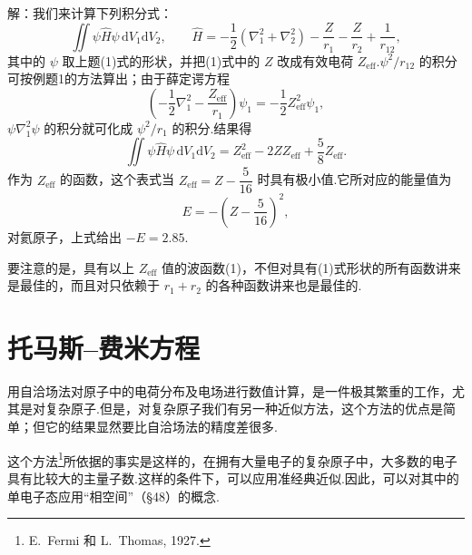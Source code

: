 \begin{xiti}
解：我们来计算下列积分式：
\begin{equation*}
  \iint\psi\hat{H}\psi\,\mathrm{d}V_1\mathrm{d}V_2,
  \qquad
  \hat{H}=-\frac{1}{2}\left(\nabla_1^{2}+\nabla_2^{2}\right)-\frac{Z}{r_1}-\frac{Z}{r_2}+\frac{1}{r_{12}},
\end{equation*}
其中的 $\psi$ 取上题(1)式的形状，并把(1)式中的 $Z$ 改成有效电荷 $Z_{\mathrm{eff}}$.$\psi^{2}/r_{12}$ 的积分可按例题1的方法算出；由于薛定谔方程
\begin{equation*}
  \left(-\frac{1}{2}\nabla_1^{2}-\frac{Z_{\mathrm{eff}}}{r_1}\right)\psi_1=-\frac{1}{2}Z_{\mathrm{eff}}^{2}\psi_1,
\end{equation*}
$\psi\nabla_1^{2}\psi$ 的积分就可化成 $\psi^{2}/r_1$ 的积分.结果得
\begin{equation*}
  \iint\psi\hat{H}\psi\,\mathrm{d}V_1\mathrm{d}V_2
  =Z_{\mathrm{eff}}^{2}-2ZZ_{\mathrm{eff}}+\frac{5}{8}Z_{\mathrm{eff}}.
\end{equation*}
作为 $Z_{\mathrm{eff}}$ 的函数，这个表式当 $Z_{\mathrm{eff}}=Z-\dfrac{5}{16}$ 时具有极小值.它所对应的能量值为
\begin{equation*}
  E=-\left(Z-\frac{5}{16}\right)^{2},
\end{equation*}
对氦原子，上式给出 $-E=2.85$.

要注意的是，具有以上 $Z_{\mathrm{eff}}$ 值的波函数(1)，不但对具有(1)式形状的所有函数讲来是最佳的，而且对只依赖于 $r_1+r_2$ 的各种函数讲来也是最佳的.

\end{xiti}
\renewcommand{\theequation}{\arabic{section}.\arabic{equation}}%

\section{托马斯–费米方程}

用自洽场法对原子中的电荷分布及电场进行数值计算，是一件极其繁重的工作，尤其是对复杂原子.但是，对复杂原子我们有另一种近似方法，这个方法的优点是简单；但它的结果显然要比自洽场法的精度差很多.

这个方法\footnote{E.~Fermi 和 L.~Thomas, 1927.}所依据的事实是这样的，在拥有大量电子的复杂原子中，大多数的电子具有比较大的主量子数.这样的条件下，可以应用准经典近似.因此，可以对其中的单电子态应用“相空间”（§48）的概念.

